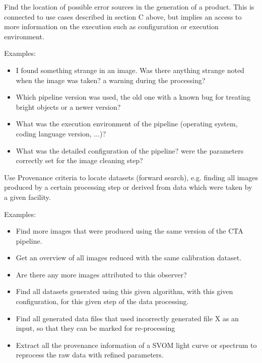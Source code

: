 Find the location of possible error sources in the generation of a product. This is connected to use cases described in section C above, but implies an access to more information on the execution such as configuration or execution environment.

        \noindent Examples:
        \begin{itemize}
            \item I found something strange in an image. Was there anything strange noted when the image was taken? a warning during the processing? 
            \item Which pipeline version was used, the old one with a known bug for treating bright objects or a newer version? 
            \item What was the execution environment of the pipeline (operating system, coding language version, ...)?
            \item What was the detailed configuration of the pipeline? were the parameters correctly set for the image cleaning step?
        \end{itemize}


        Use Provenance criteria to locate datasets (forward search), e.g. finding all images produced by a certain processing step or derived from data which were taken by a given facility.
        
        \noindent Examples:
        \begin{itemize}
            \item Find more images that were produced using the same version of the CTA pipeline.
            \item Get an overview of all images reduced with the same calibration dataset.
            \item Are there any more images attributed to this observer?  
            \item Find all datasets generated using this given algorithm, with this given configuration, for this given step of the data processing.
            \item Find all generated data files that used incorrectly generated file X as an input, so that they can be marked for re-processing
            \item Extract all the provenance information of a SVOM light curve or spectrum to reprocess the raw data with refined parameters.
        \end{itemize}

